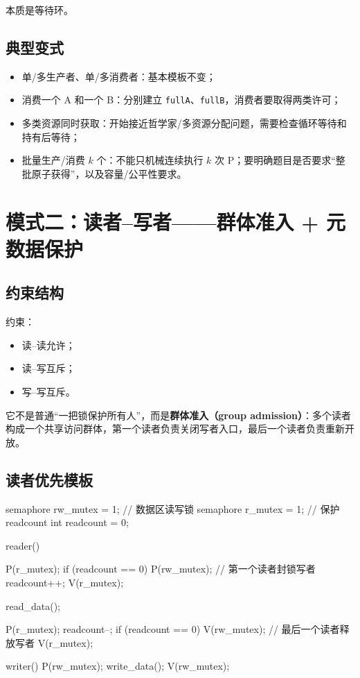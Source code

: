 \documentclass[11pt,a4paper]{ctexart}
\newcommand{\kw}[1]{\textbf{#1}}
\newcommand{\code}[1]{\texttt{#1}}
\begin{document}
本质是等待环。

\subsection{典型变式}

\begin{itemize}
\item 单/多生产者、单/多消费者：基本模板不变；
\item 消费一个 A 和一个 B：分别建立 \code{fullA}、\code{fullB}，消费者要取得两类许可；
\item 多类资源同时获取：开始接近哲学家/多资源分配问题，需要检查循环等待和持有后等待；
\item 批量生产/消费 $k$ 个：不能只机械连续执行 $k$ 次 P；要明确题目是否要求“整批原子获得”，以及容量/公平性要求。
\end{itemize}

\section{模式二：读者--写者——群体准入 + 元数据保护}

\subsection{约束结构}

约束：
\begin{itemize}
\item 读--读允许；
\item 读--写互斥；
\item 写--写互斥。
\end{itemize}
它不是普通“一把锁保护所有人”，而是\kw{群体准入（group admission）}：多个读者构成一个共享访问群体，第一个读者负责关闭写者入口，最后一个读者负责重新开放。

\subsection{读者优先模板}

\begin{codeblock}
semaphore rw_mutex = 1;  // 数据区读写锁
semaphore r_mutex  = 1;  // 保护 readcount
int readcount = 0;

reader() {
    P(r_mutex);
    if (readcount == 0)
        P(rw_mutex);      // 第一个读者封锁写者
    readcount++;
    V(r_mutex);

    read_data();

    P(r_mutex);
    readcount--;
    if (readcount == 0)
        V(rw_mutex);      // 最后一个读者释放写者
    V(r_mutex);
}

writer() {
    P(rw_mutex);
    write_data();
    V(rw_mutex);
}
\end{codeblock}
\end{document}

